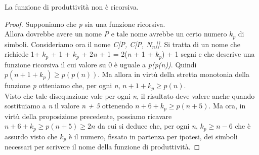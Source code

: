 \begin{thm}La funzione di produttività non è ricorsiva.
\end{thm}
\begin{proof}
Supponiamo che \emph{p} sia una funzione ricorsiva. \\ Allora dovrebbe avere un nome \emph{P} e tale nome avrebbe un certo numero \emph{$k_p$} di simboli. Consideriamo ora il nome \emph{C[P, C[P, $N_n$]]}. Si tratta di un nome che richiede 1+ \emph{$k_p$} + 1 + \emph{$k_p$} + 2\emph{n} + 1 = 2(\emph{n} + 1 + \emph{$k_p$}) + 1 segni e che descrive una funzione ricorsiva il cui valore su 0 è uguale a \emph{p(p(n))}. Quindi \emph{$p(n + 1 + k_p) \geq p(p(n))$}. Ma allora in virtù della stretta monotonia della funzione \emph{p} otteniamo che, per ogni \emph{n}, \emph{$n + 1 + k_p \geq p(n)$}. \\Visto che tale disequazione vale per ogni \emph{n}, il risultato deve valere anche quando sostituiamo a \emph{n} il valore \emph{n + 5} ottenendo \emph{$n + 6 + k_p \geq p(n + 5)$}. Ma ora, in virtù della proposizione precedente, possiamo ricavare \emph{$n + 6 + k_p \geq p(n + 5) \geq 2n$} da cui si deduce che, per ogni \emph{n},  \emph{$k_p \geq n - 6$} che è assurdo visto che \emph{$k_p$} è il numero, fissato in partenza per ipotesi, dei simboli necessari per scrivere il nome della funzione di produttività. 
 \end{proof}
